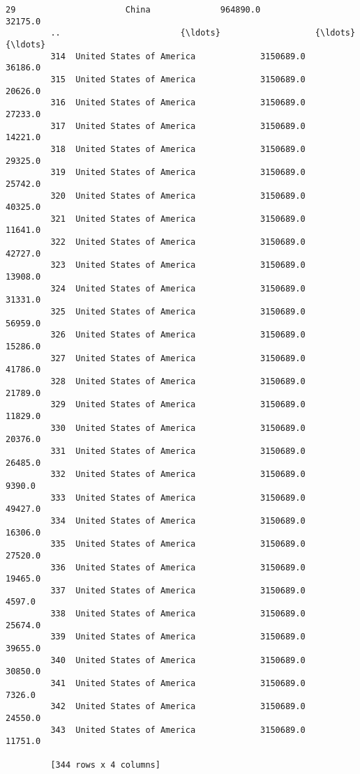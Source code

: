 \documentclass[11pt]{article}
\begin{document}
\begin{Verbatim}[commandchars=\\\{\}]
         29                      China              964890.0                  32175.0  
         ..                        {\ldots}                   {\ldots}                      {\ldots}  
         314  United States of America             3150689.0                  36186.0  
         315  United States of America             3150689.0                  20626.0  
         316  United States of America             3150689.0                  27233.0  
         317  United States of America             3150689.0                  14221.0  
         318  United States of America             3150689.0                  29325.0  
         319  United States of America             3150689.0                  25742.0  
         320  United States of America             3150689.0                  40325.0  
         321  United States of America             3150689.0                  11641.0  
         322  United States of America             3150689.0                  42727.0  
         323  United States of America             3150689.0                  13908.0  
         324  United States of America             3150689.0                  31331.0  
         325  United States of America             3150689.0                  56959.0  
         326  United States of America             3150689.0                  15286.0  
         327  United States of America             3150689.0                  41786.0  
         328  United States of America             3150689.0                  21789.0  
         329  United States of America             3150689.0                  11829.0  
         330  United States of America             3150689.0                  20376.0  
         331  United States of America             3150689.0                  26485.0  
         332  United States of America             3150689.0                   9390.0  
         333  United States of America             3150689.0                  49427.0  
         334  United States of America             3150689.0                  16306.0  
         335  United States of America             3150689.0                  27520.0  
         336  United States of America             3150689.0                  19465.0  
         337  United States of America             3150689.0                   4597.0  
         338  United States of America             3150689.0                  25674.0  
         339  United States of America             3150689.0                  39655.0  
         340  United States of America             3150689.0                  30850.0  
         341  United States of America             3150689.0                   7326.0  
         342  United States of America             3150689.0                  24550.0  
         343  United States of America             3150689.0                  11751.0  
         
         [344 rows x 4 columns]
\end{Verbatim}
            
\end{document}
